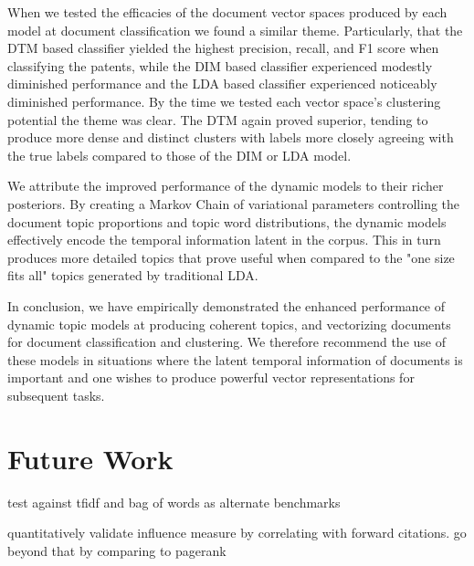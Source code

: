 When we tested the efficacies of the document vector spaces produced by each model at document classification we found a similar theme. Particularly, that the DTM based classifier yielded the highest precision, recall, and F1 score when classifying the patents, while the DIM based classifier experienced modestly diminished performance and the LDA based classifier experienced noticeably diminished performance. By the time we tested each vector space's clustering potential the theme was clear. The DTM again proved superior, tending to produce more dense and distinct clusters with labels more closely agreeing with the true labels compared to those of the DIM or LDA model.

We attribute the improved performance of the dynamic models to their richer posteriors. By creating a Markov Chain of variational parameters controlling the document topic proportions and topic word distributions, the dynamic models effectively encode the temporal information latent in the corpus. This in turn produces more detailed topics that prove useful when compared to the "one size fits all" topics generated by traditional LDA.

In conclusion, we have empirically demonstrated the enhanced performance of dynamic topic models at producing coherent topics, and vectorizing documents for document classification and clustering. We therefore recommend the use of these models in situations where the latent temporal information of documents is important and one wishes to produce powerful vector representations for subsequent tasks.

\section{Future Work}

test against tfidf and bag of words as alternate benchmarks

quantitatively validate influence measure by correlating with forward citations. go beyond that by comparing to pagerank



